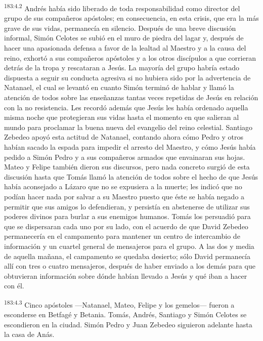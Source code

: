 \par 
\textsuperscript{183:4.2} Andrés había sido liberado de toda responsabilidad como director del grupo de sus compañeros apóstoles; en consecuencia, en esta crisis, que era la más grave de sus vidas, permanecía en silencio. Después de una breve discusión informal, Simón Celotes se subió en el muro de piedra del lagar y, después de hacer una apasionada defensa a favor de la lealtad al Maestro y a la causa del reino, exhortó a sus compañeros apóstoles y a los otros discípulos a que corrieran detrás de la tropa y rescataran a Jesús. La mayoría del grupo habría estado dispuesta a seguir su conducta agresiva si no hubiera sido por la advertencia de Natanael, el cual se levantó en cuanto Simón terminó de hablar y llamó la atención de todos sobre las enseñanzas tantas veces repetidas de Jesús en relación con la no resistencia. Les recordó además que Jesús les había ordenado aquella misma noche que protegieran sus vidas hasta el momento en que salieran al mundo para proclamar la buena nueva del evangelio del reino celestial. Santiago Zebedeo apoyó esta actitud de Natanael, contando ahora cómo Pedro y otros habían sacado la espada para impedir el arresto del Maestro, y cómo Jesús había pedido a Simón Pedro y a sus compañeros armados que envainaran sus hojas. Mateo y Felipe también dieron sus discursos, pero nada concreto surgió de esta discusión hasta que Tomás llamó la atención de todos sobre el hecho de que Jesús había aconsejado a Lázaro que no se expusiera a la muerte; les indicó que no podían hacer nada por salvar a su Maestro puesto que éste se había negado a permitir que sus amigos lo defendieran, y persistía en abstenerse de utilizar sus poderes divinos para burlar a sus enemigos humanos. Tomás los persuadió para que se dispersaran cada uno por su lado, con el acuerdo de que David Zebedeo permanecería en el campamento para mantener un centro de intercambio de información y un cuartel general de mensajeros para el grupo. A las dos y media de aquella mañana, el campamento se quedaba desierto; sólo David permanecía allí con tres o cuatro mensajeros, después de haber enviado a los demás para que obtuvieran información sobre dónde habían llevado a Jesús y qué iban a hacer con él.

\par 
\textsuperscript{183:4.3} Cinco apóstoles ---Natanael, Mateo, Felipe y los gemelos--- fueron a esconderse en Betfagé y Betania. Tomás, Andrés, Santiago y Simón Celotes se escondieron en la ciudad. Simón Pedro y Juan Zebedeo siguieron adelante hasta la casa de Anás.

